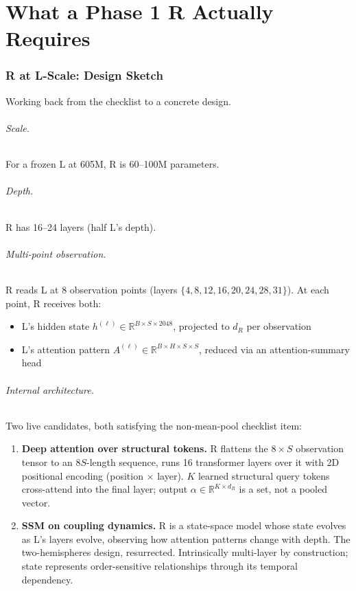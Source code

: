 \documentclass[10pt, twocolumn, a4paper]{article}
\newcommand{\R}{\mathbb{R}}
\begin{document}
\part{What a Phase 1 R Actually Requires}

\section{R at L-Scale: Design Sketch}

Working back from the checklist to a concrete design.

\paragraph{Scale.} For a frozen L at 605M, R is 60--100M parameters.

\paragraph{Depth.} R has 16--24 layers (half L's depth).

\paragraph{Multi-point observation.} R reads L at 8 observation points (layers $\{4, 8, 12, 16, 20, 24, 28, 31\}$). At each point, R receives both:
\begin{itemize}[nosep]
\item L's hidden state $h^{(\ell)} \in \R^{B \times S \times 2048}$, projected to $d_R$ per observation
\item L's attention pattern $A^{(\ell)} \in \R^{B \times H \times S \times S}$, reduced via an attention-summary head
\end{itemize}

\paragraph{Internal architecture.} Two live candidates, both satisfying the non-mean-pool checklist item:

\begin{enumerate}[nosep,leftmargin=*]
\item \textbf{Deep attention over structural tokens.} R flattens the $8 \times S$ observation tensor to an $8S$-length sequence, runs 16 transformer layers over it with 2D positional encoding (position $\times$ layer). $K$ learned structural query tokens cross-attend into the final layer; output $\alpha \in \R^{K \times d_R}$ is a set, not a pooled vector.
\item \textbf{SSM on coupling dynamics.} R is a state-space model whose state evolves as L's layers evolve, observing how attention patterns change with depth. The two-hemispheres design, resurrected. Intrinsically multi-layer by construction; state represents order-sensitive relationships through its temporal dependency.
\end{enumerate}
\end{document}

